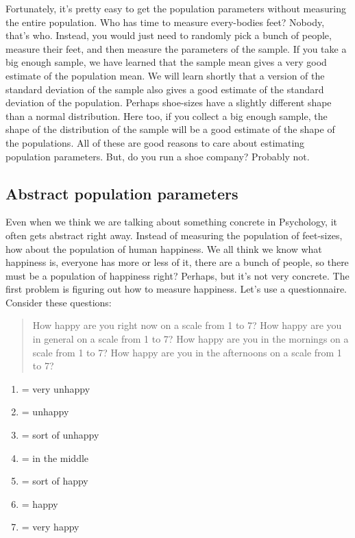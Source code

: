 \documentclass[]{book}
\providecommand{\tightlist}{%
  \setlength{\itemsep}{0pt}\setlength{\parskip}{0pt}}
\begin{document}
Fortunately, it's pretty easy to get the population parameters without measuring the entire population. Who has time to measure every-bodies feet? Nobody, that's who. Instead, you would just need to randomly pick a bunch of people, measure their feet, and then measure the parameters of the sample. If you take a big enough sample, we have learned that the sample mean gives a very good estimate of the population mean. We will learn shortly that a version of the standard deviation of the sample also gives a good estimate of the standard deviation of the population. Perhaps shoe-sizes have a slightly different shape than a normal distribution. Here too, if you collect a big enough sample, the shape of the distribution of the sample will be a good estimate of the shape of the populations. All of these are good reasons to care about estimating population parameters. But, do you run a shoe company? Probably not.

\hypertarget{abstract-population-parameters}{%
\subsection{Abstract population parameters}\label{abstract-population-parameters}}

Even when we think we are talking about something concrete in Psychology, it often gets abstract right away. Instead of measuring the population of feet-sizes, how about the population of human happiness. We all think we know what happiness is, everyone has more or less of it, there are a bunch of people, so there must be a population of happiness right? Perhaps, but it's not very concrete. The first problem is figuring out how to measure happiness. Let's use a questionnaire. Consider these questions:

\begin{quote}
How happy are you right now on a scale from 1 to 7?
How happy are you in general on a scale from 1 to 7?
How happy are you in the mornings on a scale from 1 to 7?
How happy are you in the afternoons on a scale from 1 to 7?
\end{quote}

\begin{enumerate}
\def\labelenumi{\arabic{enumi}.}
\tightlist
\item
  = very unhappy
\item
  = unhappy
\item
  = sort of unhappy
\item
  = in the middle
\item
  = sort of happy
\item
  = happy
\item
  = very happy
\end{enumerate}
\end{document}
